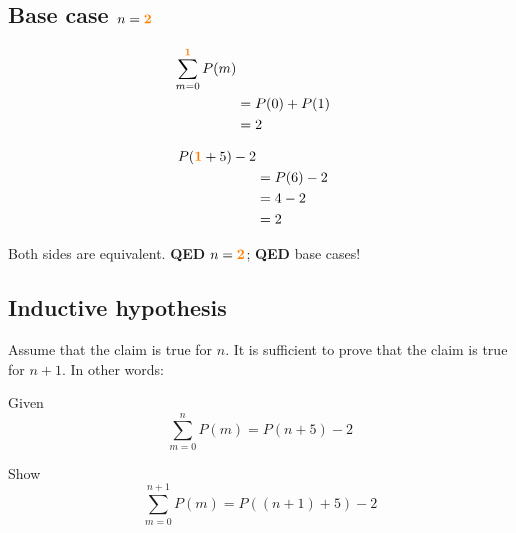 \documentclass[11pt]{article}
\def \lf {\newline}
\def \subsorange [#1]{\mathbf{\textcolor{orange}{#1}}}
\begin{document}
\subsection*{Base case $n=\subsorange[2]$}
\begin{table}[h]
   \begin{subtable}[t]{0.45\textwidth}
      \begin{alignat*}{2}
         \sum_{m=0}^{\subsorange[1]}P(m) \\
         &=P(0)+P(1) \\
         &=2
      \end{alignat*}
   \end{subtable}
   \vline
   \begin{subtable}[t]{0.45\textwidth}
      \begin{alignat*}{2}
         P(\subsorange[1]+5)-2 \\
         &=P(6)-2 \\
         &=4-2 \\
         &=2
      \end{alignat*}
   \end{subtable}
\end{table}

Both sides are equivalent. \textbf{QED} $n=\subsorange[2]$; \textbf{QED} base cases!

\subsection*{Inductive hypothesis}

Assume that the claim is true for $n$. It is sufficient to prove that the claim is true for $n+1$. In other words:\lf

Given
\[
   \sum_{m=0}^{n} P(m) = P(n+5)-2
\]

Show
\[
   \sum_{m=0}^{n + 1} P(m) = P((n+1)+5)-2
\]
\end{document}
